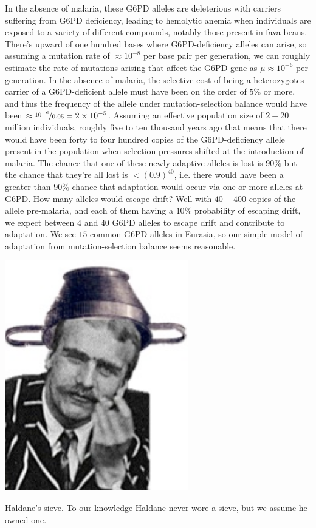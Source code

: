 {In the absence of malaria, these G6PD alleles are deleterious with
carriers suffering from G6PD deficiency,
leading to hemolytic anemia when individuals are exposed to a variety of different compounds, notably those present in fava beans.
There's upward of one hundred bases where G6PD-deficiency alleles can arise, so assuming a mutation rate of $\approx 10^{-8}$ per base pair per
generation, we can roughly estimate the rate of mutations arising that affect the G6PD gene as $\mu \approx
10^{-6}$ per generation. In the absence of malaria, the selective cost of being a heterozygotes carrier of a G6PD-deficient allele must have been on the order of
$5\%$ or more, and thus the frequency of the allele under
mutation-selection balance would have been $\approx \nicefrac{10^{-6}}{0.05} =2
\times 10^{-5}$. Assuming an effective population size of  $2-20$ million
individuals, roughly five to ten thousand years ago that means that
there would have been forty to four hundred copies of the G6PD-deficiency
allele present in the population when selection pressures shifted at the introduction of malaria. The
chance that one of these newly adaptive alleles is lost
is $90\%$ but the chance that they're all lost is $<(0.9)^{40}$, i.e. there would have been a
greater than $90\%$ chance that adaptation would occur via one or more
alleles at G6PD. How many alleles would escape drift? Well with $40 - 400$
copies of the allele pre-malaria, and each of them having a $10\%$
probability of escaping drift, we expect between $4$ and $40$ G6PD
alleles to escape drift and contribute to adaptation. We see $15$ common G6PD
alleles in Eurasia, so our simple model of adaptation from
mutation-selection balance seems reasonable.   

\begin{marginfigure}
  \begin{center}
    \includegraphics[width=0.6\textwidth]{figures/haldanes_sieve.png}
\end{center}
\caption{Haldane's sieve. To our knowledge Haldane never wore a sieve, but we assume he owned one.} \label{fig:haldanes_sieve}
\end{marginfigure}

}
